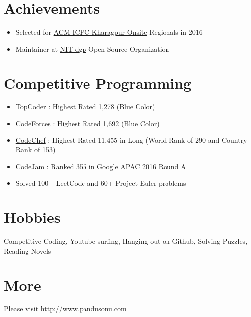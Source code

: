 \documentclass[margin, centered]{res}
\begin{document}
\begin{resume}
\section{Achievements}
\begin{itemize}[leftmargin=*]
 \item Selected for \href{acm.iitkgp.ac.in}{ACM ICPC Kharagpur Onsite} Regionals in 2016
 \item Maintainer at \href{https://github.com/NITDgpOS}{NIT-dgp} Open Source Organization
\end{itemize}


\section{Competitive Programming}
\begin{itemize}[leftmargin=*]
 \item \href{https://www.topcoder.com/members/pandusonu/details/?track=DATA_SCIENCE&subTrack=SRM}{TopCoder} : Highest Rated 1,278 (Blue Color)
 \item \href{http://codeforces.com/profile/pandusonu}{CodeForces} : Highest Rated 1,692 (Blue Color)
 \item \href{https://www.codechef.com/users/pandusonu}{CodeChef} : Highest Rated 11,455 in Long (World Rank of 290 and Country Rank of 153)
 \item \href{https://code.google.com/codejam/contest/11274486/scoreboard#sp=331}{CodeJam} : Ranked 355 in Google APAC 2016 Round A
 \item Solved 100+ LeetCode and 60+ Project Euler problems
\end{itemize}


\section{Hobbies}
Competitive Coding, Youtube surfing, Hanging out on Github, Solving Puzzles, Reading Novels

\section{More}
Please visit \href{http://www.pandusonu.com}{http://www.pandusonu.com}

\end{resume}
\end{document}
